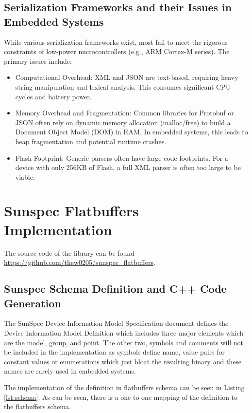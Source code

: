 \documentclass{article}
\begin{document}
\subsection{Serialization Frameworks and their Issues in Embedded Systems}
While various serialization frameworks exist, most fail to meet the rigorous constraints of low-power microcontrollers (e.g., ARM Cortex-M series). The primary issues include:
\begin{itemize}
\item Computational Overhead: XML and JSON are text-based, requiring heavy string manipulation and lexical analysis. This consumes significant CPU cycles and battery power.

\item Memory Overhead and Fragmentation: Common libraries for Protobuf or JSON often rely on dynamic memory allocation (malloc/free) to build a Document Object Model (DOM) in RAM. In embedded systems, this leads to heap fragmentation and potential runtime crashes.

\item Flash Footprint: Generic parsers often have large code footprints. For a device with only 256KB of Flash, a full XML parser is often too large to be viable.

\end{itemize}

\section{Sunspec Flatbuffers Implementation}
The source code of the library can be found \url{https://github.com/thew0205/sunspec_flatbuffers}.
\subsection{Sunspec Schema Definition and C++ Code Generation}
The SunSpec Device Information Model Specification document defines the Device Information Model Definition which includes three major elements which are the model, group, and point. The other two, symbols and comments will not be included in the implementation as symbols define name, value pairs for constant values or enumerations which just bloat the resulting binary and these names are rarely used in embedded systems.

The implementation of the definition in flatbuffers schema can be seen in Listing \ref{lst:schema}. As can be seen, there is a one to one mapping of the definition to the flatbuffers schema.
\end{document}
